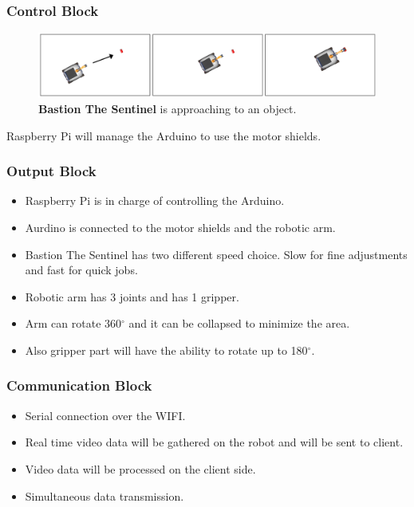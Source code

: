 \documentclass{beamer}
\begin{document}
 \begin{frame}
  \frametitle{Control Block}
  \begin{flushleft}
     \begin{figure}[h!]
      \begin{center}
       \includegraphics[scale=0.2]{3frame}
       \caption{\textbf{Bastion The Sentinel} is approaching to an object.}
      \end{center}
     \end{figure}
     Raspberry Pi will manage the Arduino to use the motor shields. 
    \end{flushleft}
 \end{frame}

 \begin{frame}
  \frametitle{Output Block}
  \begin{itemize}
   \item Raspberry Pi is in charge of controlling the Arduino.
   \item Aurdino is connected to the motor shields and the robotic arm.
   \item Bastion The Sentinel has two different speed choice. Slow for fine adjustments and fast 
   for quick jobs.
   \item Robotic arm has 3 joints and has 1 gripper.
   \item Arm can rotate 360$^{\circ}$ and it can be collapsed to minimize the area.
   \item Also gripper part will have the ability to rotate up to 180$^{\circ}$.
  \end{itemize}
 \end{frame}
 
 \begin{frame}
  \frametitle{Communication Block}
  \begin{itemize}
   \item Serial connection over the WIFI.
   \item Real time video data will be gathered on the robot and will be sent to client.
   \item Video data will be processed on the client side.
   \item Simultaneous data transmission.
  \end{itemize}
 \end{frame}
 
\end{document}
